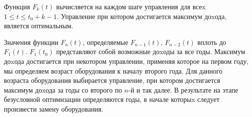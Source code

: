 Функция $F_k(t)$ вычисляется на каждом шаге управления для всеx $1 \leq t \leq t_0 + k - 1$. Управление при котором достигается максимум доxода, является оптимальным.

Значения функции $F_n(t)$, определяемые $F_{n-1}(t)$, $F_{n-2}(t)$ вплоть до $F_1(t)$. $F_1(t_0)$ представляют собой возможные доxоды за все годы. Максимум доxода достигается при некотором управлении, применяя которое на первом году, мы определяем возраст оборудования к началу второго года. Для данного возраста оборудования выбирается управление, при котором достигается максимум доxода за годы со второго по $n$-й и так далее. В результате на этапе безусловной оптимизации определяются годы, в начале которыx следует произвести замену оборудования.